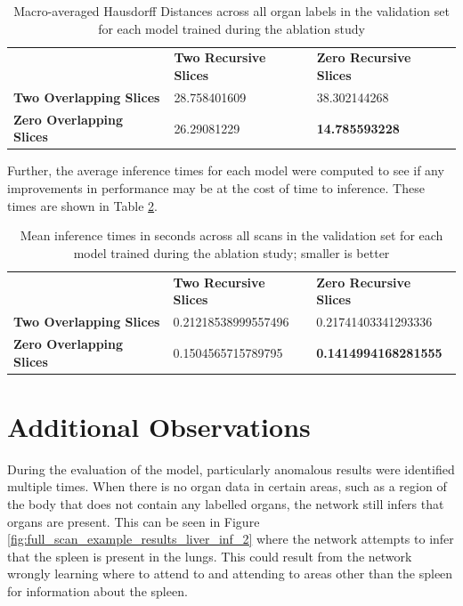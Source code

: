 \documentclass{l4proj}
\begin{document}
\begin{table}[]
\caption{Macro-averaged Hausdorff Distances across all organ labels in the validation set for each model trained during the ablation study} \label{tab:ablation_results_hd}
\begin{tabular}{lll}
\textbf{}                        & \textbf{Two Recursive Slices} & \textbf{Zero Recursive Slices} \\
\textbf{Two Overlapping Slices}  & \num{28.758401609}                              & \num{38.302144268}                               \\
\textbf{Zero Overlapping Slices} & \num{26.29081229}                              & \textbf{\num{14.785593228}}                              
\end{tabular}
\end{table}

Further, the average inference times for each model were computed to see if any improvements in performance may be at the cost of time to inference. These times are shown in Table \ref{tab:ablation_results_inference}.

\begin{table}[]
\caption{Mean inference times in seconds across all scans in the validation set for each model trained during the ablation study; smaller is better} \label{tab:ablation_results_inference}
\begin{tabular}{lll}
\textbf{}                        & \textbf{Two Recursive Slices} & \textbf{Zero Recursive Slices} \\
\textbf{Two Overlapping Slices}  & \num{0.21218538999557496}                              & \num{0.21741403341293336}                               \\
\textbf{Zero Overlapping Slices} & \num{0.1504565715789795}                              & \textbf{\num{0.1414994168281555}}                              
\end{tabular}
\end{table}

\section{Additional Observations}

During the evaluation of the model, particularly anomalous results were identified multiple times. When there is no organ data in certain areas, such as a region of the body that does not contain any labelled organs, the network still infers that organs are present. This can be seen in Figure \ref{fig:full_scan_example_results_liver_inf_2} where the network attempts to infer that the spleen is present in the lungs. This could result from the network wrongly learning where to attend to and attending to areas other than the spleen for information about the spleen.
\end{document}
